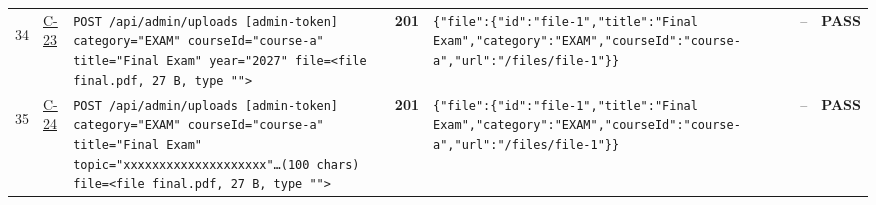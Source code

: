 \documentclass[10pt,a4paper]{article}
\begin{document}
\begin{landscape}
\begin{longtable}{@{}P{0.6cm}P{0.9cm}P{8.5cm}P{1.0cm}P{6.2cm}P{4.2cm}P{1.1cm}@{}}
\hypertarget{call34}{34} & \hyperlink{test-C-23}{C-23} & \texttt{POST /\allowbreak{}api/\allowbreak{}admin/\allowbreak{}uploads [admin-\allowbreak{}token] category=\allowbreak{}"\allowbreak{}EXAM"\allowbreak{} courseId=\allowbreak{}"\allowbreak{}course-\allowbreak{}a"\allowbreak{} title=\allowbreak{}"\allowbreak{}Final Exam"\allowbreak{} year=\allowbreak{}"\allowbreak{}2027"\allowbreak{} file=\allowbreak{}<file final.\allowbreak{}pdf,\allowbreak{} 27 B,\allowbreak{} type "\allowbreak{}"\allowbreak{}>} & \textcolor{passgreen}{\textbf{201}} & \texttt{\{"\allowbreak{}file"\allowbreak{}:\allowbreak{}\{"\allowbreak{}id"\allowbreak{}:\allowbreak{}"\allowbreak{}file-\allowbreak{}1"\allowbreak{},\allowbreak{}"\allowbreak{}title"\allowbreak{}:\allowbreak{}"\allowbreak{}Final Exam"\allowbreak{},\allowbreak{}"\allowbreak{}category"\allowbreak{}:\allowbreak{}"\allowbreak{}EXAM"\allowbreak{},\allowbreak{}"\allowbreak{}courseId"\allowbreak{}:\allowbreak{}"\allowbreak{}course-\allowbreak{}a"\allowbreak{},\allowbreak{}"\allowbreak{}url"\allowbreak{}:\allowbreak{}"\allowbreak{}/\allowbreak{}files/\allowbreak{}file-\allowbreak{}1"\allowbreak{}\}\}} & -- & \textcolor{passgreen}{\textbf{PASS}} \\
\hypertarget{call35}{35} & \hyperlink{test-C-24}{C-24} & \texttt{POST /\allowbreak{}api/\allowbreak{}admin/\allowbreak{}uploads [admin-\allowbreak{}token] category=\allowbreak{}"\allowbreak{}EXAM"\allowbreak{} courseId=\allowbreak{}"\allowbreak{}course-\allowbreak{}a"\allowbreak{} title=\allowbreak{}"\allowbreak{}Final Exam"\allowbreak{} topic=\allowbreak{}"\allowbreak{}xxxxxxxxxxxxxxxxxx\allowbreak{}xx"\allowbreak{}…(100 chars) file=\allowbreak{}<file final.\allowbreak{}pdf,\allowbreak{} 27 B,\allowbreak{} type "\allowbreak{}"\allowbreak{}>} & \textcolor{passgreen}{\textbf{201}} & \texttt{\{"\allowbreak{}file"\allowbreak{}:\allowbreak{}\{"\allowbreak{}id"\allowbreak{}:\allowbreak{}"\allowbreak{}file-\allowbreak{}1"\allowbreak{},\allowbreak{}"\allowbreak{}title"\allowbreak{}:\allowbreak{}"\allowbreak{}Final Exam"\allowbreak{},\allowbreak{}"\allowbreak{}category"\allowbreak{}:\allowbreak{}"\allowbreak{}EXAM"\allowbreak{},\allowbreak{}"\allowbreak{}courseId"\allowbreak{}:\allowbreak{}"\allowbreak{}course-\allowbreak{}a"\allowbreak{},\allowbreak{}"\allowbreak{}url"\allowbreak{}:\allowbreak{}"\allowbreak{}/\allowbreak{}files/\allowbreak{}file-\allowbreak{}1"\allowbreak{}\}\}} & -- & \textcolor{passgreen}{\textbf{PASS}} \\

\end{longtable}
\end{landscape}
\end{document}

